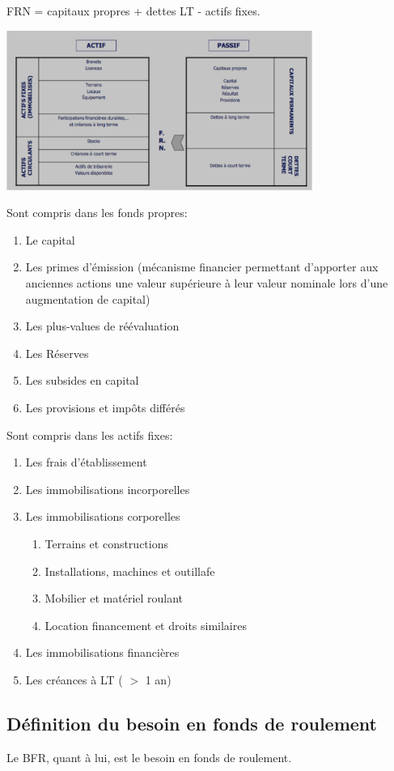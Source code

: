 \documentclass{article}
\begin{document}
\begin{center}
	FRN = capitaux propres + dettes LT - actifs fixes.
\end{center}

\includegraphics[width=10cm]{c7.png}

Sont compris dans les fonds propres: 
\begin{enumerate}
	\item Le capital
	\item Les primes d'émission (mécanisme financier permettant d'apporter aux anciennes actions une valeur supérieure à leur valeur nominale lors d'une augmentation de capital)
	\item Les plus-values de réévaluation
	\item Les Réserves
	\item Les subsides en capital
	\item Les provisions et impôts différés
\end{enumerate}

Sont compris dans les actifs fixes:
\begin{enumerate}
	\item Les frais d'établissement
	\item Les immobilisations incorporelles
	\item Les immobilisations corporelles
	\begin{enumerate}
		\item Terrains et constructions
		\item Installations, machines et outillafe
		\item Mobilier et matériel roulant
		\item Location financement et droits similaires
	\end{enumerate}
	\item Les immobilisations financières
	\item Les créances à LT ( $>$ 1 an)
\end{enumerate}

\subsection{Définition du besoin en fonds de roulement}
Le BFR, quant à lui, est le besoin en fonds de roulement. 
\end{document}
